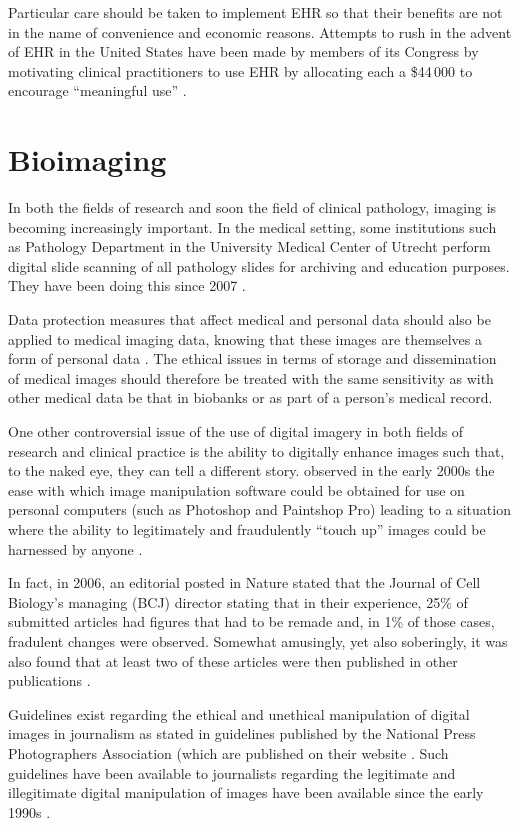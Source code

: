 \documentclass[british,a4paper, 12pt]{article}
\begin{document}
Particular care should be taken to implement EHR so that their benefits are not in the 
name of convenience and economic reasons. Attempts to rush in the advent of EHR in the 
United States have been made by members of its Congress by motivating clinical 
practitioners to use EHR  by allocating each a \$44\,000 to encourage ``meaningful use'' 
\parencite{jha2010meaningful}.

\section{Bioimaging}
In both the fields of research and soon the field of clinical pathology, imaging is becoming 
increasingly important. In the medical setting, some institutions such as Pathology Department 
in the University Medical Center of Utrecht perform digital slide scanning of all pathology 
slides for archiving and education purposes. They have been doing this since 2007
\parencite{stathonikos2013going}.

Data protection measures that affect medical and personal data should also be 
applied to medical imaging data, knowing that these images are themselves a form 
of personal data \parencite{duquenoy2008considering}. The ethical issues in terms of storage
and dissemination of medical images should therefore be treated with the same
sensitivity as with other medical data be that in biobanks or as part of a person's
medical record.

One other controversial issue of the use of digital imagery in both fields of research and 
clinical practice is the ability to digitally enhance images such that, to the naked eye, they 
can tell a different story. \citeauthor*{cutrone2001true} observed in the early 2000s the ease 
with which image manipulation software could be obtained for use on personal computers  (such as 
Photoshop and Paintshop Pro) leading to a situation where the ability to legitimately and 
fraudulently ``touch up'' images could be harnessed by anyone \parencite{cutrone2001true}.

In fact, in 2006, an editorial posted in Nature stated that the Journal of Cell Biology's
managing (BCJ) director stating that in their experience, 25\% of submitted articles had figures that
had to be remade and, in 1\% of those cases, fradulent changes were observed. Somewhat amusingly,
yet also soberingly, it was also found that at least two of these articles were then published
in other publications \parencite{cromey2009digital}.

Guidelines exist regarding the ethical and unethical manipulation of digital images in journalism as
stated in guidelines published by the National Press Photographers Association (which are
published on their website \parencite{national2012ethics}. Such guidelines have been available to
journalists regarding the legitimate and illegitimate digital manipulation of images have been
available since the early 1990s \parencite{cromey2010avoiding}.
\end{document}
